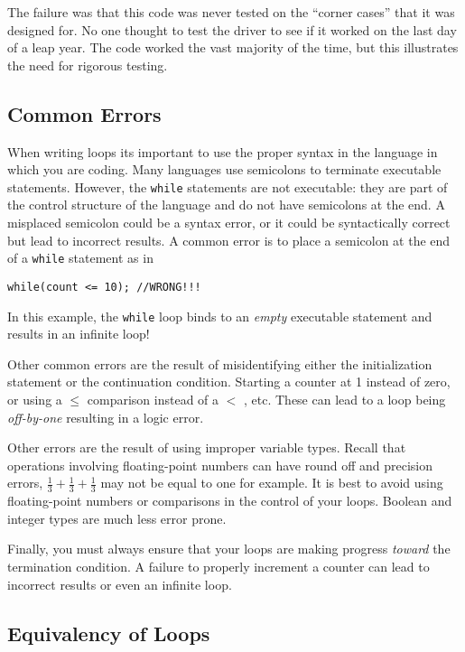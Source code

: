 The failure was that this code was never tested on the 
``corner cases'' that it was designed for.  No one thought to test the driver to see
if it worked on the last day of a leap year.  The code worked the vast majority of the time, 
but this illustrates the need for rigorous testing.

\subsection{Common Errors}

When writing loops its important to use the proper syntax in the
language in which you are coding.  Many languages use semicolons
to terminate executable statements.  However, the \texttt{while}
statements are not executable: they are part of the control structure
of the language and do not have semicolons at the end.  A misplaced
semicolon could be a syntax error, or it could be syntactically correct
but lead to incorrect results.  A common error is to place a semicolon
at the end of a \texttt{while} statement as in 

\texttt{while(count <= 10); //WRONG!!!}

In this example, the \texttt{while} loop binds to an \emph{empty}
executable statement and results in an infinite loop!

Other common errors are the result of misidentifying either the
initialization statement or the continuation condition.  Starting a
counter at 1 instead of zero, or using a $\leq$ comparison instead
of a $<$ , etc.  These can lead to a loop being \emph{off-by-one} 
resulting in a logic error.

Other errors are the result of using improper variable types.
Recall that operations involving floating-point numbers can have 
round off and precision errors, $\frac{1}{3} + \frac{1}{3} + \frac{1}{3}$
may not be equal to one for example.  It is best to avoid using 
floating-point numbers or comparisons in the control of your loops.
Boolean and integer types are much less error prone.  

Finally, you must always ensure that your loops are making progress
\emph{toward} the termination condition.  A failure to properly 
increment a counter can lead to incorrect results or even an infinite
loop.

\subsection{Equivalency of Loops}

